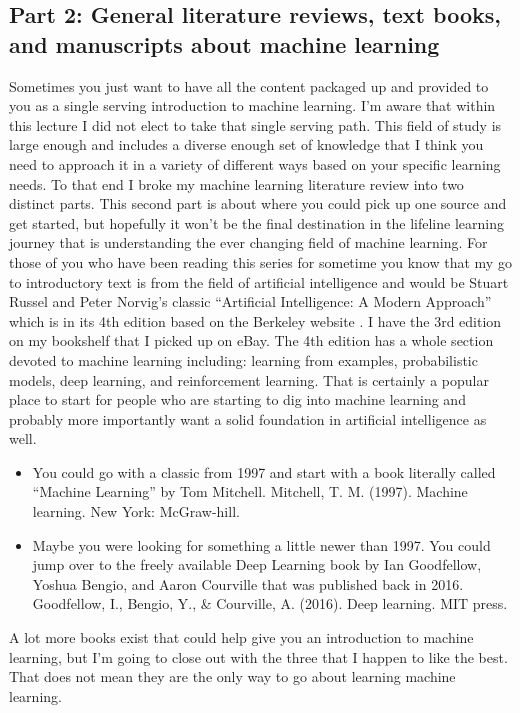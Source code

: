 \documentclass{article}
\begin{document}
\subsection{Part 2: General literature reviews, text books, and manuscripts about machine learning}
Sometimes you just want to have all the content packaged up and provided to you as a single serving introduction to machine learning. I’m aware that within this lecture I did not elect to take that single serving path. This field of study is large enough and includes a diverse enough set of knowledge that I think you need to approach it in a variety of different ways based on your specific learning needs. To that end I broke my machine learning literature review into two distinct parts. This second part is about where you could pick up one source and get started, but hopefully it won’t be the final destination in the lifeline learning journey that is understanding the ever changing field of machine learning. For those of you who have been reading this series for sometime you know that my go to introductory text is from the field of artificial intelligence and would be Stuart Russel and Peter Norvig’s classic “Artificial Intelligence: A Modern Approach” which is in its 4th edition based on the Berkeley website \cite{rusell2003artificial}. I have the 3rd edition on my bookshelf that I picked up on eBay. The 4th edition has a whole section devoted to machine learning including: learning from examples, probabilistic models, deep learning, and reinforcement learning. That is certainly a popular place to start for people who are starting to dig into machine learning and probably more importantly want a solid foundation in artificial intelligence as well. 

\begin{itemize}
\item You could go with a classic from 1997 and start with a book literally called “Machine Learning” by Tom Mitchell. Mitchell, T. M. (1997). Machine learning. New York: McGraw-hill. \cite{mitchell1997machine}
\item Maybe you were looking for something a little newer than 1997. You could jump over to the freely available Deep Learning book by Ian Goodfellow, Yoshua Bengio, and Aaron Courville that was published back in 2016. Goodfellow, I., Bengio, Y., \& Courville, A. (2016). Deep learning. MIT press. \cite{goodfellow2016deep}
\end{itemize}

A lot more books exist that could help give you an introduction to machine learning, but I’m going to close out with the three that I happen to like the best. That does not mean they are the only way to go about learning machine learning. 
\end{document}
